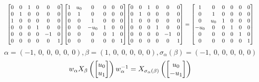 \documentclass[11pt]{article}
\theoremstyle{definition}
\begin{document}
\[
\scaletoalign{\textwidth}{{\left[\begin{matrix}0 & 0 & 1 & 0 & 0 & 0\\0 & 1 & 0 & 0 & 0 & 0\\1 & 0 & 0 & 0 & 0 & 0\\0 & 0 & 0 & 1 & 0 & 0\\0 & 0 & 0 & 0 & -1 & 0\\0 & 0 & 0 & 0 & 0 & 1\end{matrix}\right]} {\left[\begin{matrix}1 & u_{0} & 0 & 0 & 0 & 0\\0 & 1 & 0 & 0 & 0 & 0\\0 & 0 & 1 & 0 & 0 & 0\\0 & 0 & - u_{0} & 1 & 0 & 0\\0 & 0 & 0 & 0 & 1 & 0\\0 & 0 & 0 & 0 & 0 & 1\end{matrix}\right]} {\left[\begin{matrix}0 & 0 & 1 & 0 & 0 & 0\\0 & 1 & 0 & 0 & 0 & 0\\1 & 0 & 0 & 0 & 0 & 0\\0 & 0 & 0 & 1 & 0 & 0\\0 & 0 & 0 & 0 & -1 & 0\\0 & 0 & 0 & 0 & 0 & 1\end{matrix}\right]} = {\left[\begin{matrix}1 & 0 & 0 & 0 & 0 & 0\\0 & 1 & 0 & 0 & 0 & 0\\0 & u_{0} & 1 & 0 & 0 & 0\\- u_{0} & 0 & 0 & 1 & 0 & 0\\0 & 0 & 0 & 0 & 1 & 0\\0 & 0 & 0 & 0 & 0 & 1\end{matrix}\right]}}
\]
\[
\alpha = \left( -1, \  0, \  0, \  0, \  0, \  0\right), \beta = \left( 1, \  0, \  0, \  0, \  0, \  0\right), \sigma_{\alpha}(\beta) = \left( -1, \  0, \  0, \  0, \  0, \  0\right)
\]
\[
\scaletoalign{\textwidth}{w_{\alpha} X_{\beta}\left(\left[\begin{matrix}u_{0}\\u_{1}\end{matrix}\right]\right) w_{\alpha}^{-1} = X_{\sigma_{\alpha}\left(\beta\right)}\left(\left[\begin{matrix}u_{0}\\- u_{1}\end{matrix}\right]\right)}
\]
\end{document}

